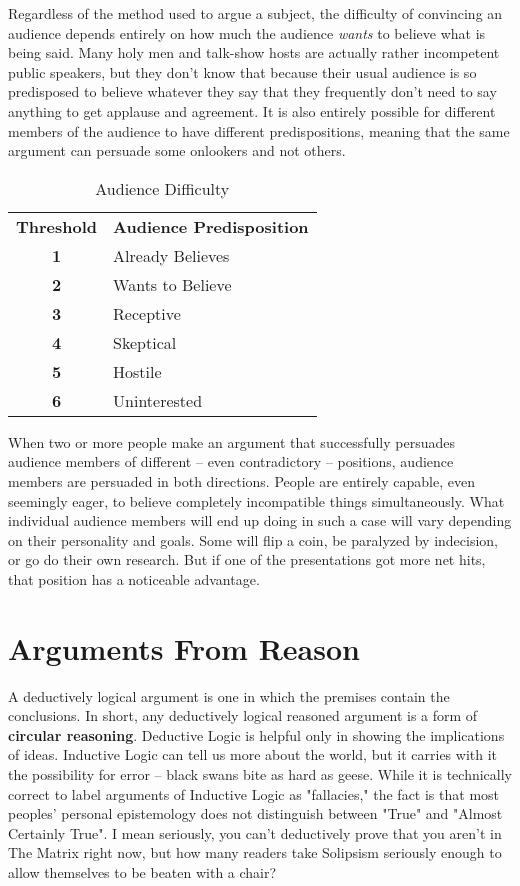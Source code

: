 Regardless of the method used to argue a subject, the difficulty of convincing an audience depends entirely on how much the audience \textit{wants} to believe what is being said. Many holy men and talk-show hosts are actually rather incompetent public speakers, but they don't know that because their usual audience is so predisposed to believe whatever they say that they frequently don't need to say anything to get applause and agreement. It is also entirely possible for different members of the audience to have different predispositions, meaning that the same argument can persuade some onlookers and not others.

\begin{table}[htb]\center
\caption{Audience Difficulty} 
\begin{tabular}{c l}
\textbf{Threshold} & \textbf{Audience Predisposition} \\
\textbf{1} & Already Believes \\
\textbf{2} & Wants to Believe \\
\textbf{3} & Receptive \\
\textbf{4} & Skeptical \\
\textbf{5} & Hostile \\
\textbf{6} & Uninterested \\
\end{tabular}
\end{table}

When two or more people make an argument that successfully persuades audience members of different -- even contradictory -- positions, audience members are persuaded in both directions. People are entirely capable, even seemingly eager, to believe completely incompatible things simultaneously. What individual audience members will end up doing in such a case will vary depending on their personality and goals. Some will flip a coin, be paralyzed by indecision, or go do their own research. But if one of the presentations got more net hits, that position has a noticeable advantage.

\section{Arguments From Reason}

A deductively logical argument is one in which the premises contain the conclusions. In short, any deductively logical reasoned argument is a form of \textbf{circular reasoning}. Deductive Logic is helpful only in showing the implications of ideas. Inductive Logic can tell us more about the world, but it carries with it the possibility for error -- black swans bite as hard as geese. While it is technically correct to label arguments of Inductive Logic as "fallacies," the fact is that most peoples' personal epistemology does not distinguish between "True" and "Almost Certainly True". I mean seriously, you can't deductively prove that you aren't in The Matrix right now, but how many readers take Solipsism seriously enough to allow themselves to be beaten with a chair?

